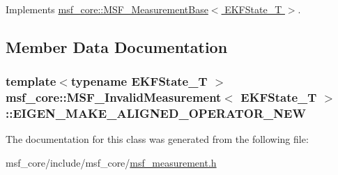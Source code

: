Implements \hyperlink{classmsf__core_1_1MSF__MeasurementBase_a6a711d7ed976c0aed497efc1b8fbe3e7}{msf\-\_\-core\-::\-M\-S\-F\-\_\-\-Measurement\-Base$<$ E\-K\-F\-State\-\_\-\-T $>$}.



\subsection{Member Data Documentation}
\hypertarget{classmsf__core_1_1MSF__InvalidMeasurement_aa86e5b98f45256afded1bf30391dcce2}{
\subsubsection[{E\-I\-G\-E\-N\-\_\-\-M\-A\-K\-E\-\_\-\-A\-L\-I\-G\-N\-E\-D\-\_\-\-O\-P\-E\-R\-A\-T\-O\-R\-\_\-\-N\-E\-W}]{\setlength{\rightskip}{0pt plus 5cm}template$<$typename E\-K\-F\-State\-\_\-\-T $>$ {\bf msf\-\_\-core\-::\-M\-S\-F\-\_\-\-Invalid\-Measurement}$<$ E\-K\-F\-State\-\_\-\-T $>$\-::E\-I\-G\-E\-N\-\_\-\-M\-A\-K\-E\-\_\-\-A\-L\-I\-G\-N\-E\-D\-\_\-\-O\-P\-E\-R\-A\-T\-O\-R\-\_\-\-N\-E\-W}}\label{classmsf__core_1_1MSF__InvalidMeasurement_aa86e5b98f45256afded1bf30391dcce2}


The documentation for this class was generated from the following file\-:\begin{DoxyCompactItemize}
\item 
msf\-\_\-core/include/msf\-\_\-core/\hyperlink{msf__measurement_8h}{msf\-\_\-measurement.\-h}\end{DoxyCompactItemize}
